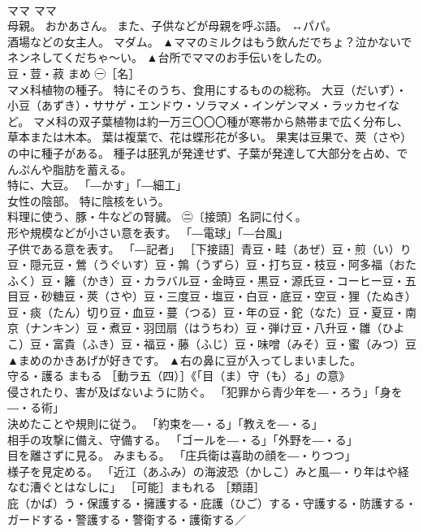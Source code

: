 \documentclass[8pt]{extreport}
\begin{document}
\begin{CJK}{UTF8}{min}
\\	ママ	ママ	
\\	母親。 おかあさん。 また、子供などが母親を呼ぶ語。 ↔パパ。 
\\	酒場などの女主人。 マダム。	▲ママのミルクはもう飲んだでちょ？泣かないでネンネしてくだちゃ〜い。 ▲台所でママのお手伝いをしたの。
\\	豆・荳・菽	まめ	㊀［名］ 
\\	マメ科植物の種子。 特にそのうち、食用にするものの総称。 大豆（だいず）・小豆（あずき）・ササゲ・エンドウ・ソラマメ・インゲンマメ・ラッカセイなど。 マメ科の双子葉植物は約一万三〇〇〇種が寒帯から熱帯まで広く分布し、草本または木本。 葉は複葉で、花は蝶形花が多い。 果実は豆果で、莢（さや）の中に種子がある。 種子は胚乳が発達せず、子葉が発達して大部分を占め、でんぷんや脂肪を蓄える。 
\\	特に、大豆。 「―かす」「―細工」 
\\	女性の陰部。 特に陰核をいう。 
\\	料理に使う、豚・牛などの腎臓。 ㊁〔接頭〕名詞に付く。 
\\	形や規模などが小さい意を表す。 「―電球」「―台風」 
\\	子供である意を表す。 「―記者」 ［下接語］青豆・畦（あぜ）豆・煎（い）り豆・隠元豆・鶯（うぐいす）豆・鶉（うずら）豆・打ち豆・枝豆・阿多福（おたふく）豆・籬（かき）豆・カラバル豆・金時豆・黒豆・源氏豆・コーヒー豆・五目豆・砂糖豆・莢（さや）豆・三度豆・塩豆・白豆・底豆・空豆・狸（たぬき）豆・痰（たん）切り豆・血豆・蔓（つる）豆・年の豆・鉈（なた）豆・夏豆・南京（ナンキン）豆・煮豆・羽団扇（はうちわ）豆・弾け豆・八升豆・雛（ひよこ）豆・富貴（ふき）豆・福豆・藤（ふじ）豆・味噌（みそ）豆・蜜（みつ）豆	▲まめのかきあげが好きです。 ▲右の鼻に豆が入ってしまいました。
\\	守る・護る	まもる	［動ラ五（四）］《「目（ま）守（も）る」の意》 
\\	侵されたり、害が及ばないように防ぐ。 「犯罪から青少年を―・ろう」「身を―・る術」 
\\	決めたことや規則に従う。 「約束を―・る」「教えを―・る」 
\\	相手の攻撃に備え、守備する。 「ゴールを―・る」「外野を―・る」 
\\	目を離さずに見る。 みまもる。 「庄兵衛は喜助の顔を―・りつつ」 
\\	様子を見定める。 「近江（あふみ）の海波恐（かしこ）みと風―・り年はや経なむ漕ぐとはなしに」 ［可能］まもれる ［類語］
\\	庇（かば）う・保護する・擁護する・庇護（ひご）する・守護する・防護する・ガードする・警護する・警衛する・護衛する／

\end{CJK}
\end{document}
